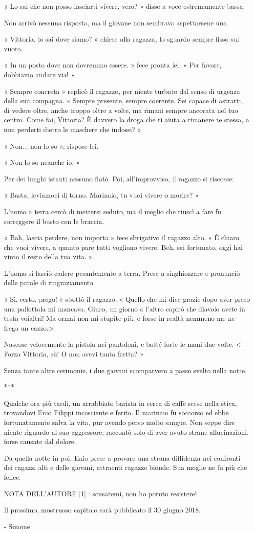 « Lo sai che non posso lasciarti vivere, vero? » disse a voce estremamente bassa.

Non arrivò nessuna risposta, ma il giovane non sembrava aspettarsene una.

« Vittoria, lo sai dove siamo? » chiese alla ragazza, lo sguardo sempre fisso sul vuoto.

« In un posto dove non dovremmo essere. » fece pronta lei. « Per favore, dobbiamo andare via! »

« Sempre concreta » replicò il ragazzo, per niente turbato dal senso di urgenza della sua compagna. « Sempre presente, sempre coerente. Sei capace di astrarti, di vedere oltre, anche troppo oltre a volte, ma rimani sempre ancorata nel tuo centro. Come fai, Vittoria? È davvero la droga che ti aiuta a rimanere te stessa, a non perderti dietro le maschere che indossi? »

« Non... non lo so », rispose lei.

« Non lo so neanche io. »

Per dei lunghi istanti nessuno fiatò. Poi, all'improvviso, il ragazzo si riscosse:

« Basta, leviamoci di torno. Marinaio, tu vuoi vivere o morire? »

L'uomo a terra cercò di mettersi seduto, ma il meglio che riuscì a fare fu sorreggere il busto con le braccia.

« Bah, lascia perdere, non importa » fece sbrigativo il ragazzo alto. « È chiaro che vuoi vivere, a quanto pare tutti vogliono vivere. Beh, sei fortunato, oggi hai vinto il resto della tua vita. »

L'uomo si lasciò cadere pesantemente a terra. Prese a singhiozzare e pronunciò delle parole di ringraziamento.

« Sì, certo, prego! » sbottò il ragazzo. « Quello che mi dice grazie dopo aver preso una pallottola mi mancava. Giuro, un giorno o l'altro capirò che diavolo avete in testa voialtri! Ma ormai non mi stupite più, e forse in realtà nemmeno me ne frega un cazzo.> 

Nascose velocemente la pistola nei pantaloni, e batté forte le mani due volte. 
< Forza Vittoria, sù! O non avevi tanta fretta? »

Senza tante altre cerimonie, i due giovani scomparvero a passo svelto nella notte.

***

Qualche ora più tardi, un arrabbiato barista in cerca di caffè scese nella stiva, trovandovi Enio Filippi incosciente e ferito. Il marinaio fu soccorso ed ebbe fortunatamente salva la vita, pur avendo perso molto sangue. Non seppe dire niente riguardo al suo aggressore; raccontò solo di aver avuto strane allucinazioni, forse causate dal dolore.

Da quella notte in poi, Enio prese a provare una strana diffidenza nei confronti dei ragazzi alti e delle giovani, attraenti ragazze bionde. Sua moglie ne fu più che felice.

NOTA DELL'AUTORE
[1] : scusatemi, non ho potuto resistere!

Il prossimo, mostruoso capitolo sarà pubblicato il 30 giugno 2018.

- Simone



